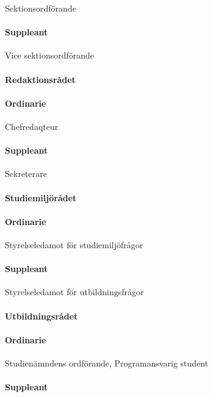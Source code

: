 \documentclass[a4paper,12pt]{article}
\begin{document}
Sektionsordförande

\paragraph{Suppleant}

Vice sektionsordförande

\paragraph{Redaktionsrådet}

\paragraph{Ordinarie}

Chefredaqteur

\paragraph{Suppleant}

Sekreterare

\paragraph{Studiemiljörådet}

\paragraph{Ordinarie}

Styrelseledamot för studiemiljöfrågor

\paragraph{Suppleant}

Styrelseledamot för utbildningsfrågor

\paragraph{Utbildningsrådet}

\paragraph{Ordinarie}

Studienämndens ordförande, Programansvarig student

\paragraph{Suppleant}
\end{document}
